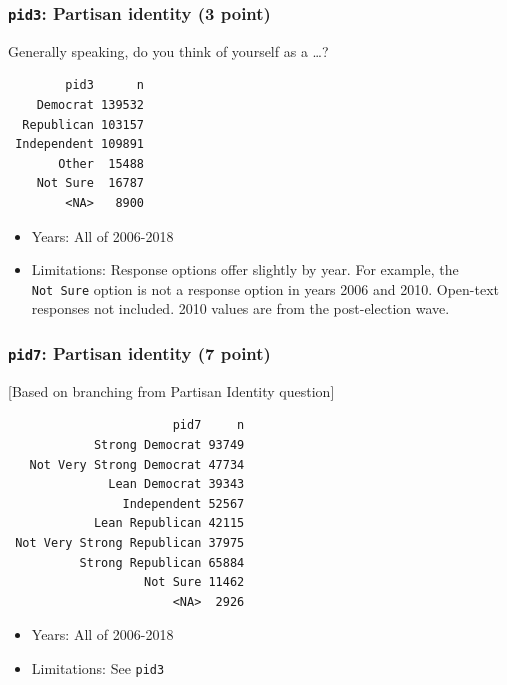 \documentclass[10pt,article,oneside]{memoir}
\theoremstyle{definition}
\begin{document}
\hypertarget{pid3-partisan-identity-3-point}{%
\subsubsection{\texorpdfstring{\texttt{pid3}: Partisan identity (3
point)}{pid3: Partisan identity (3 point)}}\label{pid3-partisan-identity-3-point}}

Generally speaking, do you think of yourself as a \ldots{}?

\begin{verbatim}
        pid3      n
    Democrat 139532
  Republican 103157
 Independent 109891
       Other  15488
    Not Sure  16787
        <NA>   8900
\end{verbatim}

\begin{itemize}
\tightlist
\item
  Years: All of 2006-2018
\item
  Limitations: Response options offer slightly by year. For example, the
  \texttt{Not\ Sure} option is not a response option in years 2006 and
  2010. Open-text responses not included. 2010 values are from the
  post-election wave.
\end{itemize}

\hypertarget{pid7-partisan-identity-7-point}{%
\subsubsection{\texorpdfstring{\texttt{pid7}: Partisan identity (7
point)}{pid7: Partisan identity (7 point)}}\label{pid7-partisan-identity-7-point}}

{[}Based on branching from Partisan Identity question{]}

\begin{verbatim}
                       pid7     n
            Strong Democrat 93749
   Not Very Strong Democrat 47734
              Lean Democrat 39343
                Independent 52567
            Lean Republican 42115
 Not Very Strong Republican 37975
          Strong Republican 65884
                   Not Sure 11462
                       <NA>  2926
\end{verbatim}

\begin{itemize}
\tightlist
\item
  Years: All of 2006-2018
\item
  Limitations: See \texttt{pid3}
\end{itemize}
\end{document}
